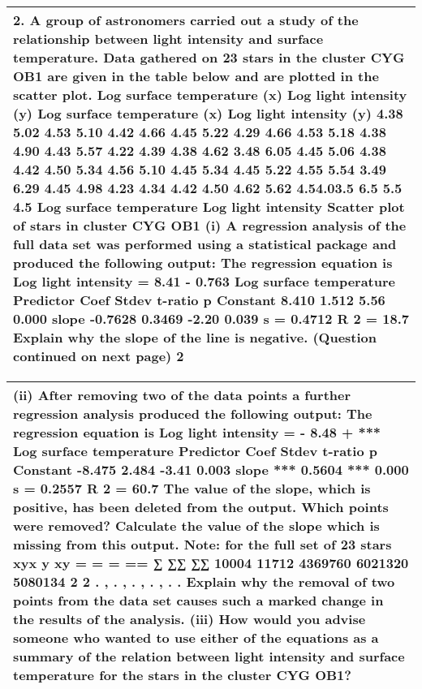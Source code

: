 \documentclass[a4paper,12pt]{article}
\begin{document}
\begin{table}[ht!]
 \centering
 \begin{tabular}{|p{15cm}|}
 \hline  
2. A group of astronomers carried out  a study of the relationship between light intensity and surface temperature. Data  gathered on 23 stars in the cluster CYG OB1 are given in the table below and are plotted in the scatter plot.
Log surface temperature (x)
Log light intensity (y)
Log surface temperature (x)
Log light intensity (y) 4.38 5.02 4.53 5.10 4.42 4.66 4.45 5.22 4.29 4.66 4.53 5.18 4.38 4.90 4.43 5.57 4.22 4.39 4.38 4.62 3.48 6.05 4.45 5.06 4.38 4.42 4.50 5.34 4.56 5.10 4.45 5.34 4.45 5.22 4.55 5.54 3.49 6.29 4.45 4.98 4.23 4.34 4.42 4.50 4.62 5.62
4.54.03.5
6.5
5.5
4.5
Log surface temperature
Log light intensity
Scatter plot of stars in cluster CYG OB1
(i) A regression analysis of the full data set was performed using a statistical package and produced the following output:
The regression equation is   Log light intensity = 8.41 - 0.763 Log surface temperature
Predictor       Coef       Stdev        t-ratio        p
Constant       8.410       1.512         5.56     0.000
slope           -0.7628      0.3469      -2.20     0.039                   s = 0.4712     R
2
= 18.7%
Explain why the slope of the line is negative.
(Question continued on next page)
2

\\ \hline
  \end{tabular}
\end{table}

\begin{table}[ht!]
 \centering
 \begin{tabular}{|p{15cm}|}
 \hline  
(ii) After removing two of the data points a further regression analysis produced the following output:
The regression equation is   Log light intensity  = - 8.48 +  *** Log surface temperature
Predictor       Coef       Stdev    t-ratio        p
Constant      -8.475       2.484      -3.41    0.003
slope            ***          0.5604      ***      0.000            s = 0.2557      R
2
 = 60.7%
The value of the slope, which is positive, has been deleted from the output.
Which points were removed? Calculate the value of the slope which is missing from this output.
Note: for the full set of 23 stars
xyx
y xy
= = =
== ∑ ∑∑ ∑∑ 10004 11712 4369760 6021320 5080134 2 2 . , . , . , . , . .
Explain why the removal of two points from the data set causes such a marked change in the results of the analysis.
(iii) How would you advise someone who wanted to use either of the equations as a summary of the relation between light intensity and surface temperature for the stars in the cluster CYG OB1?\\ \hline
  \end{tabular}
\end{table}
\end{document}
